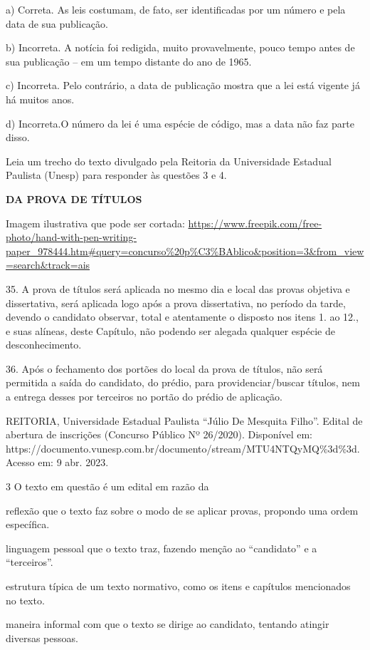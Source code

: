 a) Correta. As leis costumam, de fato, ser identificadas por um número e
pela data de sua publicação.

b) Incorreta. A notícia foi redigida, muito provavelmente, pouco tempo
antes de sua publicação -- em um tempo distante do ano de 1965.

c) Incorreta. Pelo contrário, a data de publicação mostra que a lei está
vigente já há muitos anos.

d) Incorreta.O número da lei é uma espécie de código, mas a data não faz
parte disso.

Leia um trecho do texto divulgado pela Reitoria da Universidade Estadual
Paulista (Unesp) para responder às questões 3 e 4.

\textbf{DA PROVA DE TÍTULOS}

Imagem ilustrativa que pode ser cortada:
\url{https://www.freepik.com/free-photo/hand-with-pen-writing-paper_978444.htm\#query=concurso\%20p\%C3\%BAblico\&position=3\&from_view=search\&track=ais}

35. A prova de títulos será aplicada no mesmo dia e local das provas
objetiva e dissertativa, será aplicada logo após a prova dissertativa,
no período da tarde, devendo o candidato observar, total e atentamente o
disposto nos itens 1. ao 12., e suas alíneas, deste Capítulo, não
podendo ser alegada qualquer espécie de desconhecimento.

36. Após o fechamento dos portões do local da prova de títulos, não será
permitida a saída do candidato, do prédio, para providenciar/buscar
títulos, nem a entrega desses por terceiros no portão do prédio de
aplicação.

REITORIA, Universidade Estadual Paulista ``Júlio De Mesquita Filho''.
Edital de abertura de inscrições (Concurso Público Nº 26/2020).
Disponível em:
https://documento.vunesp.com.br/documento/stream/MTU4NTQyMQ\%3d\%3d.
Acesso em: 9 abr. 2023.

\num{3} O texto em questão é um edital em razão da

\begin{escolha}
\item reflexão que o texto faz sobre o modo de se aplicar provas, propondo
uma ordem específica.

\item linguagem pessoal que o texto traz, fazendo menção ao ``candidato''
e a ``terceiros''.

\item estrutura típica de um texto normativo, como os itens e capítulos
mencionados no texto.

\item maneira informal com que o texto se dirige ao candidato, tentando
atingir diversas pessoas.
\end{escolha}

